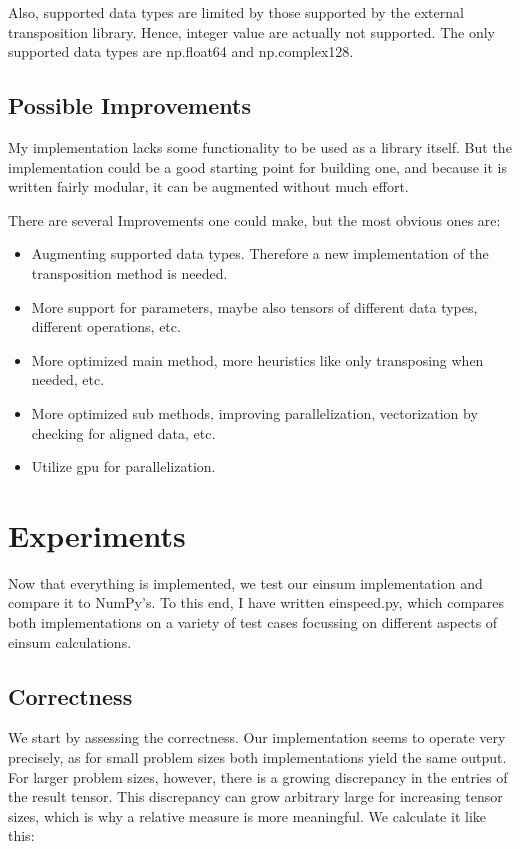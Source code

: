 \documentclass[sigconf]{acmart}
\renewcommand{\texttt}[1]{\begingroup\ttfamily\sloppy\hbadness=10000 #1\endgroup}
\begin{document}
Also, supported data types are limited by those supported by the external transposition library. Hence, integer value are actually not supported. The only supported data types are \texttt{np.float64} and \texttt{np.complex128}.


\subsection{Possible Improvements}
My implementation lacks some functionality to be used as a library itself. But the implementation could be a good starting point for building one, and because it is written fairly modular, it can be augmented without much effort.

There are several Improvements one could make, but the most obvious ones are:
\begin{itemize}
  \item Augmenting supported data types. Therefore a new implementation of the transposition method is needed.
  \item More support for parameters, maybe also tensors of different data types, different operations, etc.
  \item More optimized main method, more heuristics like only transposing when needed, etc.
  \item More optimized sub methods, improving parallelization, vectorization by checking for aligned data, etc.
  \item Utilize gpu for parallelization.
\end{itemize}



\section{Experiments}
\label{sec:experiments}

Now that everything is implemented, we test our einsum implementation and compare it to NumPy's. To this end, I have written \texttt{einspeed.py}, which compares both implementations on a variety of test cases focussing on different aspects of einsum calculations.

\subsection{Correctness}
We start by assessing the correctness. Our implementation seems to operate very precisely, as for small problem sizes both implementations yield the same output. For larger problem sizes, however, there is a growing discrepancy in the entries of the result tensor. This discrepancy can grow arbitrary large for increasing tensor sizes, which is why a relative measure is more meaningful. We calculate it like this:
\end{document}
